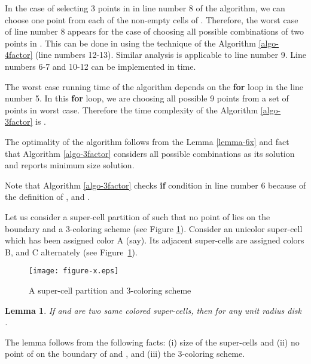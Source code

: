 \documentclass[a4paper,11pt]{article}
\newtheorem{lemma}{Lemma}
\newenvironment{proof}{\noindent {\bf Proof:\,\ }}{\hfill\mbox{\
}\smallskip}
\begin{document}
\begin{proof}
 In the case of selecting 3 points in  in line number 8 of the algorithm, we can choose one point from 
 each of the non-empty cells  of . Therefore, the worst case of line number 8 appears for the 
 case of choosing all possible combinations of two points in . This can be done in  using 
 the technique of the Algorithm \ref{algo-4factor} (line numbers 12-13). Similar analysis is applicable to line 
 number 9. Line numbers 6-7 and 10-12 can be implemented in  time.
 
 The worst case running time of the algorithm depends on the {\bf for} loop in the line number 5. In this 
 {\bf for} loop, we are choosing all possible 9 points from a set of  points in worst case. Therefore the
 time complexity of the Algorithm \ref{algo-3factor} is .  
 
 The optimality of the algorithm follows from the Lemma \ref{lemma-6x} and fact that Algorithm \ref{algo-3factor} 
 considers all possible combinations as its solution and reports minimum size solution.
 
 Note that Algorithm \ref{algo-3factor} checks {\bf if} condition in line number 6 because of the definition 
 of , and . 
\end{proof}

Let us consider a super-cell partition of  such that no point of  lies on the boundary and a 
3-coloring scheme (see Figure \ref{fig:fig15}). Consider an unicolor super-cell which has been assigned 
color A (say). Its adjacent super-cells are assigned colors B, and C alternately (see Figure~\ref{fig:fig15}). 

\begin{figure}[ht]
\begin{center}
\texttt{[image: figure-x.eps]}
\caption{A super-cell partition and 3-coloring scheme}
\label{fig:fig15}
\end{center}
\end{figure}

\begin{lemma} \label{lemma-8x}
 If  and  are two same colored super-cells, then 
  for any unit radius disk .
\end{lemma}

\begin{proof}
The lemma follows from the following facts: (i) size of the super-cells  and  
(ii) no point of  on the boundary of  and , and (iii) the 3-coloring scheme.  
\end{proof}
\end{document}

